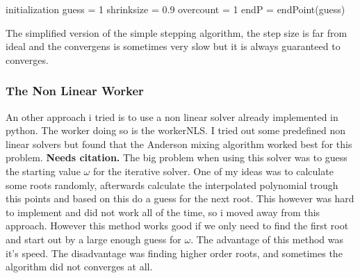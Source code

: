 \begin{algorithm}[H]
 initialization\;
 guess = 1\;
 shrinksize = 0.9\;
 overcount = 1\;
 endP = endPoint(guess)\;
 
 \caption{The simplified version of the simple stepping algorithm, the step size is far from ideal and the convergens is sometimes very slow but it is always guaranteed to converges.}
 \label{alg:stupid}
\end{algorithm}

\subsubsection{The Non Linear Worker}

An other approach i tried is to use a non linear solver already implemented in python.
The worker doing so is the workerNLS.
I tried out some predefined non linear solvers but found that the Anderson mixing algorithm worked best for this problem. \textbf{Needs citation.}
The big problem when using this solver was to guess the starting value  $ \omega $ for the iterative solver.
One of my ideas was to calculate some roots randomly, afterwards calculate the interpolated polynomial trough this points and based on this do a guess for the next root.
This however was hard to implement and did not work all of the time, so i moved away from this approach.
However this method works good if we only need to find the first root and start out by a large enough guess for $ \omega $.
The advantage of this method was it's speed.
The disadvantage was finding higher order roots, and sometimes the algorithm did not converges at all.


